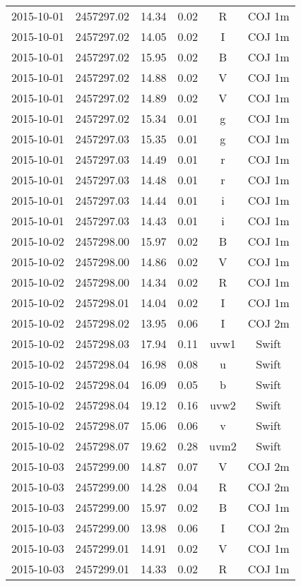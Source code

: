 \begin{table}
\begin{tabular}{cccccc}
2015-10-01 & 2457297.02 & 14.34 & 0.02 & R & COJ 1m \\
2015-10-01 & 2457297.02 & 14.05 & 0.02 & I & COJ 1m \\
2015-10-01 & 2457297.02 & 15.95 & 0.02 & B & COJ 1m \\
2015-10-01 & 2457297.02 & 14.88 & 0.02 & V & COJ 1m \\
2015-10-01 & 2457297.02 & 14.89 & 0.02 & V & COJ 1m \\
2015-10-01 & 2457297.02 & 15.34 & 0.01 & g & COJ 1m \\
2015-10-01 & 2457297.03 & 15.35 & 0.01 & g & COJ 1m \\
2015-10-01 & 2457297.03 & 14.49 & 0.01 & r & COJ 1m \\
2015-10-01 & 2457297.03 & 14.48 & 0.01 & r & COJ 1m \\
2015-10-01 & 2457297.03 & 14.44 & 0.01 & i & COJ 1m \\
2015-10-01 & 2457297.03 & 14.43 & 0.01 & i & COJ 1m \\
2015-10-02 & 2457298.00 & 15.97 & 0.02 & B & COJ 1m \\
2015-10-02 & 2457298.00 & 14.86 & 0.02 & V & COJ 1m \\
2015-10-02 & 2457298.00 & 14.34 & 0.02 & R & COJ 1m \\
2015-10-02 & 2457298.01 & 14.04 & 0.02 & I & COJ 1m \\
2015-10-02 & 2457298.02 & 13.95 & 0.06 & I & COJ 2m \\
2015-10-02 & 2457298.03 & 17.94 & 0.11 & uvw1 & Swift \\
2015-10-02 & 2457298.04 & 16.98 & 0.08 & u & Swift \\
2015-10-02 & 2457298.04 & 16.09 & 0.05 & b & Swift \\
2015-10-02 & 2457298.04 & 19.12 & 0.16 & uvw2 & Swift \\
2015-10-02 & 2457298.07 & 15.06 & 0.06 & v & Swift \\
2015-10-02 & 2457298.07 & 19.62 & 0.28 & uvm2 & Swift \\
2015-10-03 & 2457299.00 & 14.87 & 0.07 & V & COJ 2m \\
2015-10-03 & 2457299.00 & 14.28 & 0.04 & R & COJ 2m \\
2015-10-03 & 2457299.00 & 15.97 & 0.02 & B & COJ 1m \\
2015-10-03 & 2457299.00 & 13.98 & 0.06 & I & COJ 2m \\
2015-10-03 & 2457299.01 & 14.91 & 0.02 & V & COJ 1m \\
2015-10-03 & 2457299.01 & 14.33 & 0.02 & R & COJ 1m \\

\end{tabular}
\end{table}
